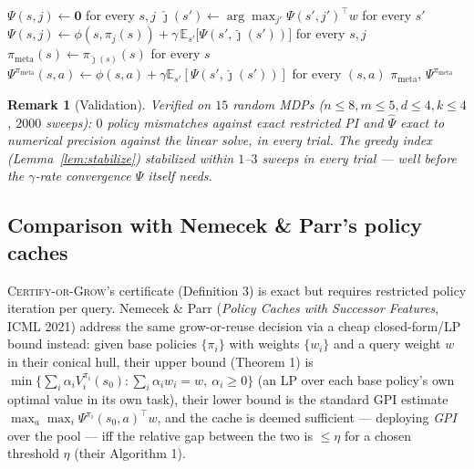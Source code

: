 \documentclass[11pt]{article}
\newtheorem{remark}{Remark}
\begin{document}
\begin{algorithm}[H]
\caption{\textsc{MetaPolicyVI}$(\{\pi_1,\dots,\pi_k\},w)$ — metapolicy and its SF table, exact/synchronous}\label{alg:metapolicyvi}
\begin{algorithmic}[1]
\State $\Psi(s,j) \gets \mathbf 0$ for every $s,j$
\Repeat
  \State $\hat\jmath(s') \gets \arg\max_{j'}\Psi(s',j')^\top w$ for every $s'$
  \State $\Psi(s,j) \gets \phi(s,\pi_j(s)) + \gamma\,\mathbb E_{s'}\big[\Psi(s',\hat\jmath(s'))\big]$ for every $s,j$
\State $\pi_{\mathrm{meta}}(s)\gets\pi_{\hat\jmath(s)}(s)$ for every $s$
\State $\Psi^{\pi_{\mathrm{meta}}}(s,a) \gets \phi(s,a)+\gamma\mathbb E_{s'}[\Psi(s',\hat\jmath(s'))]$ for every $(s,a)$
\State \Return $\pi_{\mathrm{meta}}$, $\Psi^{\pi_{\mathrm{meta}}}$
\end{algorithmic}
\end{algorithm}

\begin{remark}[Validation]
Verified on $15$ random MDPs ($n{\le}8,m{\le}5,d{\le}4,k{\le}4$, $2000$ sweeps): $0$ policy mismatches against exact
restricted PI and $\widehat\Psi$ exact to numerical precision against the linear solve, in every trial. The greedy
index (Lemma~\ref{lem:stabilize}) stabilized within $1$–$3$ sweeps in every trial — well before the $\gamma$-rate
convergence $\Psi$ itself needs.
\end{remark}

\subsection{Comparison with Nemecek \& Parr's policy caches}\label{sec:nemecek-parr}

\textsc{Certify-or-Grow}'s certificate (Definition 3) is exact but requires restricted policy iteration per query.
Nemecek \& Parr (\emph{Policy Caches with Successor Features}, ICML 2021) address the same grow-or-reuse decision via
a cheap closed-form/LP bound instead: given base
policies $\{\pi_i\}$ with weights $\{w_i\}$ and a query weight $w$ in their conical hull, their upper bound (Theorem 1)
is $\min\{\sum_i\alpha_i V_i^{\pi_i}(s_0): \sum_i\alpha_i w_i=w,\ \alpha_i\ge0\}$ (an LP over each base policy's own
optimal value in its own task), their lower bound is the standard GPI estimate $\max_a\max_i\Psi^{\pi_i}(s_0,a)^\top w$,
and the cache is deemed sufficient — deploying \emph{GPI} over the pool — iff the relative gap between the two is
$\le\eta$ for a chosen threshold $\eta$ (their Algorithm 1).
\end{document}

